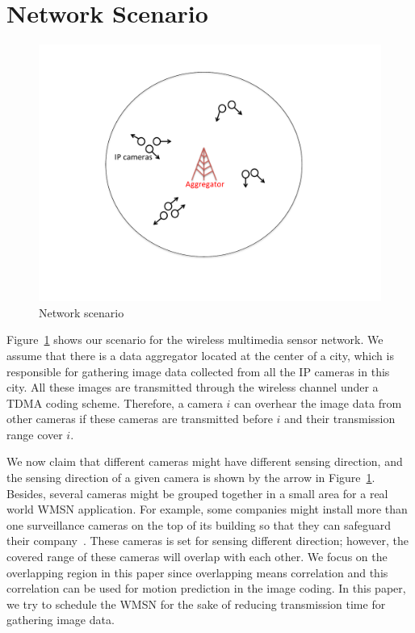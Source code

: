 \section{Network Scenario}
\label{sec:NetworkScenario}
\begin{figure}
\begin{center}
\includegraphics[width=0.7\columnwidth]{surveillanceCamera}
\caption{\label{fig:networkScenario}Network scenario}
\end{center}
\end{figure}
Figure~\ref{fig:networkScenario} shows our scenario for the wireless multimedia
sensor network.
We assume that there is a data aggregator located at the center of a city, which
is responsible for gathering image data collected from all the IP cameras in
this city.
All these images are transmitted through the wireless channel under a TDMA
coding scheme.
Therefore, a camera $i$ can overhear the image data from other cameras if these
cameras are transmitted before $i$ and their transmission range cover $i$.

We now claim that different cameras might have different sensing direction, and
the sensing direction of a given camera is shown by the arrow in
Figure~\ref{fig:networkScenario}.
Besides, several cameras might be grouped together in a small area for a real
world WMSN application.
For example, some companies might install more than one surveillance cameras on
the top of its building so that they can safeguard their
company~\cite{CameraInstallation}.
These cameras is set for sensing different direction; however, the covered range
of these cameras will overlap with each other.
We focus on the overlapping region in this paper since overlapping means
correlation and this correlation can be used for motion prediction in the
image coding.
In this paper, we try to schedule the WMSN for the sake of reducing transmission time for gathering image data.